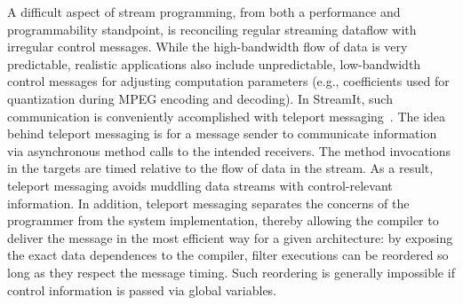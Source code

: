 \label{sec:messaging}
\vspace{-11pt}

A difficult aspect of stream programming, from both a performance and
programmability standpoint, is reconciling regular streaming dataflow
with irregular control messages.  While the high-bandwidth flow of
data is very predictable, realistic applications also include
unpredictable, low-bandwidth control messages for adjusting
computation parameters (e.g., coefficients used for quantization
during MPEG encoding and decoding).  In StreamIt, such communication
is conveniently accomplished with teleport
messaging~\cite{thies05ppopp}.  The idea behind teleport messaging is
for a message sender to communicate information via asynchronous
method calls to the intended receivers. The method invocations in the
targets are timed relative to the flow of data in the stream. As a
result, teleport messaging avoids muddling data streams with
control-relevant information. In addition, teleport messaging
separates the concerns of the programmer from the system
implementation, thereby allowing the compiler to deliver the message
in the most efficient way for a given architecture: by exposing the
exact data dependences to the compiler, filter executions can be
reordered so long as they respect the message timing. Such reordering
is generally impossible if control information is passed via global
variables.

